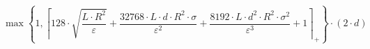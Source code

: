 \[\max\left\{ 1, \left\lceil 128 \cdot \sqrt{\frac{L \cdot R^{2}}{\varepsilon}} + \frac{32768 \cdot L \cdot d \cdot R^{2} \cdot \sigma}{\varepsilon^{2}} + \frac{8192 \cdot L \cdot d^{2} \cdot R^{2} \cdot \sigma^{2}}{\varepsilon^{3}} + 1 \right\rceil_{+} \right\} \cdot \left(2 \cdot d\right)\]

